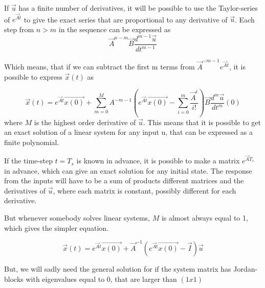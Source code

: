 If $\Vec{u}$ has a finite number of derivatives, it will be possible to use the Taylor-series of $e^{\Vec{A}t}$ to give the exact series that are proportional to any derivative of $\Vec{u}$. Each step from $n > m$ in the sequence can be expressed as 
\begin{equation}
    \Vec{A}^{n-m}\Vec{B}\frac{d^{m-1}\Vec{u}}{dt^{m-1}}
\end{equation}{}

Which means, that if we can subtract the first m terms from $\Vec{A}^{-m-1}e^{\Vec{A}t}$, it is possible to express $\Vec{x}(t)$ as 

\begin{equation}
    \Vec{x}(t) = e^{\Vec{A}t}\Vec{x(0)} + \sum_{m=0}^M A^{-m-1}\left( e^{\Vec{A}t}\Vec{x(0)} - \sum_{i=0}^{m}\frac{\Vec{A}^i}{i!} \right)\Vec{B}\frac{d^m\Vec{u}}{dt^m}(0)
\end{equation}{}
where $M$ is the highest order derivative of $\Vec{u}$. This means that it is possible to get an exact solution of a linear system for any input u, that can be expressed as a finite polynomial. 

If the time-step $t=T_s$ is known in advance, it is possible to make a matrix $e^{\Vec{A}T_s}$ in advance, which can give an exact solution for any initial state. The response from the inputs will have to be a sum of products different matrices and the derivatives of $\Vec{u}$, where each matrix is constant, possibly different for each derivative.


But whenever somebody solves linear systems, $M$ is almost always equal to 1, which gives the simpler equation. 

\begin{equation}
        \Vec{x}(t) = e^{\Vec{A}t}\Vec{x(0)} + \Vec{A}^{-1}\left( e^{\Vec{A}t}\Vec{x(0)} - \Vec{I} \right)\Vec{u}
\end{equation}{}

But, we will sadly need the general solution for if the system matrix has Jordan-blocks with eigenvalues equal to 0, that are larger than $(1x1)$

    



